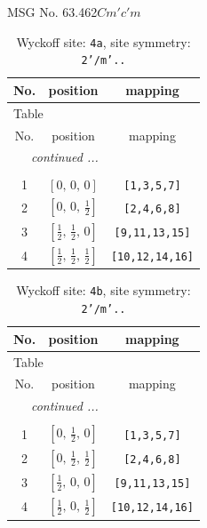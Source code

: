 \documentclass[fleqn,8pt]{jsarticle}
\begin{document}
\setcounter{MaxMatrixCols}{32}

\renewcommand{\tablename}{Table~}
\renewcommand{\figurename}{Figure~}
\begin{center}
\LARGE
MSG No. 63.462\quad$Cm'c'm$
\end{center}
\renewcommand{\arraystretch}{1.2}
\begin{longtable}{ccc}
\caption{Wyckoff site: {\tt 4a}, site symmetry: {\tt 2'/m'..}}
 \\
 \hline \hline
No. & position & mapping \\ \hline \endfirsthead

\multicolumn{2}{l}{\tablename\ \thetable{}} \\
 \hline \hline
No. & position & mapping \\ \hline \endhead

 \hline \hline
\multicolumn{2}{r}{\footnotesize\it continued ...} \\ \endfoot

 \hline \hline
\multicolumn{2}{r}{} \\ \endlastfoot

1 & $\left[ 0,\, 0,\, 0 \right]$ & {\tt [1,3,5,7]} \\ \hline
2 & $\left[ 0,\, 0,\, \frac{1}{2} \right]$ & {\tt [2,4,6,8]} \\ \hline
3 & $\left[ \frac{1}{2},\, \frac{1}{2},\, 0 \right]$ & {\tt [9,11,13,15]} \\ \hline
4 & $\left[ \frac{1}{2},\, \frac{1}{2},\, \frac{1}{2} \right]$ & {\tt [10,12,14,16]} \\
\end{longtable}
\renewcommand{\arraystretch}{1.2}
\begin{longtable}{ccc}
\caption{Wyckoff site: {\tt 4b}, site symmetry: {\tt 2'/m'..}}
 \\
 \hline \hline
No. & position & mapping \\ \hline \endfirsthead

\multicolumn{2}{l}{\tablename\ \thetable{}} \\
 \hline \hline
No. & position & mapping \\ \hline \endhead

 \hline \hline
\multicolumn{2}{r}{\footnotesize\it continued ...} \\ \endfoot

 \hline \hline
\multicolumn{2}{r}{} \\ \endlastfoot

1 & $\left[ 0,\, \frac{1}{2},\, 0 \right]$ & {\tt [1,3,5,7]} \\ \hline
2 & $\left[ 0,\, \frac{1}{2},\, \frac{1}{2} \right]$ & {\tt [2,4,6,8]} \\ \hline
3 & $\left[ \frac{1}{2},\, 0,\, 0 \right]$ & {\tt [9,11,13,15]} \\ \hline
4 & $\left[ \frac{1}{2},\, 0,\, \frac{1}{2} \right]$ & {\tt [10,12,14,16]} \\
\end{longtable}
\end{document}
